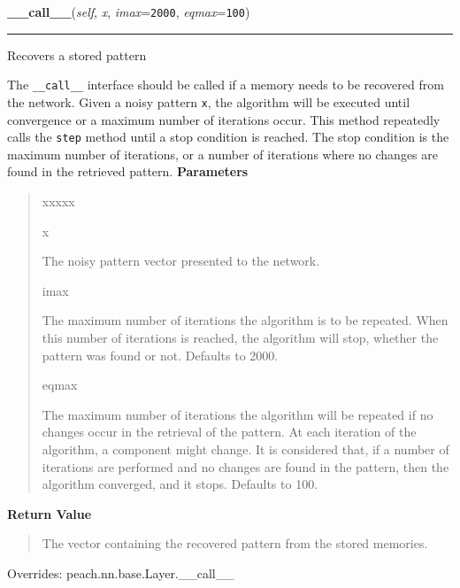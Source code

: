 \hspace{.8\funcindent}\begin{boxedminipage}{\funcwidth}

    \raggedright \textbf{\_\_call\_\_}(\textit{self}, \textit{x}, \textit{imax}={\tt 2000}, \textit{eqmax}={\tt 100})

    \vspace{-1.5ex}

    \rule{\textwidth}{0.5\fboxrule}
\setlength{\parskip}{2ex}

Recovers a stored pattern

The \texttt{\_\_call\_\_} interface should be called if a memory needs to be
recovered from the network. Given a noisy pattern \texttt{x}, the algorithm
will be executed until convergence or a maximum number of iterations
occur. This method repeatedly calls the \texttt{step} method until a stop
condition is reached. The stop condition is the maximum number of
iterations, or a number of iterations where no changes are found in the
retrieved pattern.
\setlength{\parskip}{1ex}
      \textbf{Parameters}
      \vspace{-1ex}

      \begin{quote}
        \begin{Ventry}{xxxxx}

          \item[x]


The noisy pattern vector presented to the network.
          \item[imax]


The maximum number of iterations the algorithm is to be repeated.
When this number of iterations is reached, the algorithm will stop,
whether the pattern was found or not. Defaults to 2000.
          \item[eqmax]


The maximum number of iterations the algorithm will be repeated if
no changes occur in the retrieval of the pattern. At each iteration
of the algorithm, a component might change. It is considered that,
if a number of iterations are performed and no changes are found in
the pattern, then the algorithm converged, and it stops. Defaults to
100.
        \end{Ventry}

      \end{quote}

      \textbf{Return Value}
    \vspace{-1ex}

      \begin{quote}

The vector containing the recovered pattern from the stored memories.
      \end{quote}

      Overrides: peach.nn.base.Layer.\_\_call\_\_

    \end{boxedminipage}


